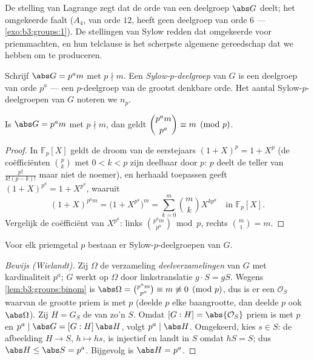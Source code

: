 De stelling van Lagrange zegt dat de orde van een deelgroep $\abs
G$ deelt; het omgekeerde faalt ($A_4$, van orde $12$, heeft geen
deelgroep van orde $6$ --- \cref{exo:b3:groups:1}). De stellingen
van Sylow redden dat omgekeerde voor priemmachten, en hun telclause
is het scherpste algemene gereedschap dat we hebben om
 te produceren.

\begin{definition}\label{def:b3:groups:sylow}
Schrijf $\abs G = p^a m$ met $p \nmid m$. Een
\emph{Sylow-$p$-deelgroep} van $G$ is een
deelgroep van orde $p^a$ --- een $p$-deelgroep van de grootst
denkbare orde. Het aantal Sylow-$p$-deelgroepen van $G$ noteren we
$n_p$.
\end{definition}

\begin{lemma}\label{lem:b3:groups:binom}
Is $\abs G = p^a m$ met $p \nmid m$, dan geldt $\dbinom{p^a
m}{p^a} \equiv m \pmod p$.
\end{lemma}

\begin{proof}
In $\mathbb F_p[X]$ geldt de droom van de eerstejaars $(1+X)^p = 1
+ X^p$ (de coëfficiënten $\binom pk$ met $0<k<p$ zijn deelbaar door
$p$: $p$ deelt de teller van $\frac{p!}{k!(p-k)!}$ maar niet de
noemer), en herhaald toepassen geeft $(1+X)^{p^a} = 1 + X^{p^a}$,
waaruit
\[
(1+X)^{p^a m} = \bigl(1 + X^{p^a}\bigr)^m
= \sum_{k=0}^{m} \binom mk X^{k p^a} \quad\text{in } \mathbb
F_p[X].
\]
Vergelijk de coëfficiënt van $X^{p^a}$: links $\binom{p^a m}{p^a}
\bmod p$, rechts $\binom m1 = m$.
\end{proof}

\begin{theorem}\label{thm:b3:groups:sylow1}
Voor elk priemgetal $p$ bestaan er Sylow-$p$-deelgroepen van $G$.
\end{theorem}

\begin{proof}[Bewijs (Wielandt)]
Zij $\Omega$ de verzameling \emph{deelverzamelingen} van $G$ met
kardinaliteit $p^a$; $G$ werkt op $\Omega$ door linkstranslatie $g
\cdot S = gS$. Wegens \cref{lem:b3:groups:binom} is $\abs\Omega =
\binom{p^a m}{p^a} \equiv m \not\equiv 0 \pmod p$, dus is er een
 $\mathcal O_S$ waarvan de grootte priem is met $p$ (deelde $p$
elke baangrootte, dan deelde $p$ ook $\abs\Omega$). Zij $H = G_S$
de  van zo'n $S$. Omdat $[G : H] = \abs{\mathcal O_S}$
priem is met $p$ en $p^a \mid \abs G = [G:H]\,\abs H$, volgt $p^a
\mid \abs H$. Omgekeerd, kies $s \in S$: de afbeelding $H \to S$,
$h \mapsto hs$, is injectief en landt in $S$ omdat $hS = S$; dus
$\abs H \leq \abs S = p^a$. Bijgevolg is $\abs H = p^a$.
\end{proof}

